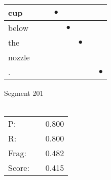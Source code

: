 \documentclass[landscape]{article}
\newcommand{\ssp}{\hspace{2pt}}
\newcommand{\mex}{\cellcolor{g}$\bullet$}
\begin{document}
\begin{tabular}{|l|p{10pt}|p{10pt}|p{10pt}|p{10pt}|p{10pt}|p{10pt}|p{10pt}|}
\hline
\ssp \cellcolor{ref2}cup \ssp&\hspace{2pt}&\hspace{2pt}&\hspace{2pt}\mex&\hspace{2pt}&\hspace{2pt}&\hspace{2pt}&\hspace{2pt}\\
\hline
\ssp \cellcolor{ref3}below \ssp&\hspace{2pt}&\hspace{2pt}&\hspace{2pt}&\hspace{2pt}\mex&\hspace{2pt}&\hspace{2pt}&\hspace{2pt}\\
\hline
\ssp \cellcolor{ref4}the \ssp&\hspace{2pt}&\hspace{2pt}&\hspace{2pt}&\hspace{2pt}&\hspace{2pt}\mex&\hspace{2pt}&\hspace{2pt}\\
\hline
\ssp nozzle \ssp&\hspace{2pt}&\hspace{2pt}&\hspace{2pt}&\hspace{2pt}&\hspace{2pt}&\hspace{2pt}&\hspace{2pt}\\
\hline
\ssp \cellcolor{ref6}. \ssp&\hspace{2pt}&\hspace{2pt}&\hspace{2pt}&\hspace{2pt}&\hspace{2pt}&\hspace{2pt}&\hspace{2pt}\mex\\
\hline
\end{tabular}

\vspace{6pt}
\noindent Segment 201\\\\
\noindent\begin{tabular}{lm{12pt}r}
\hline
P:&&0.800\\
R:&&0.800\\
Frag:&&0.482\\
Score:&&0.415\\
\end{tabular}
\end{document}
